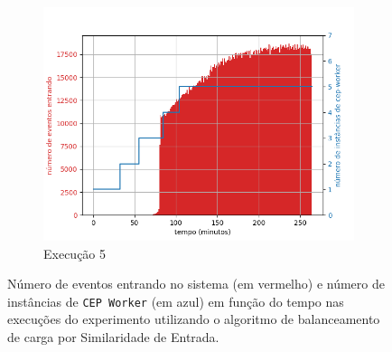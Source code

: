 \begin{figure}[p]
\begin{subfigure}{.5\textwidth}
  \includegraphics[width=\linewidth]{figuras/graphics/carga_e_workers_total10-dez-is.png}  
  \caption{Execução 5}
  \label{fig:cewt-10-dez-is}
\end{subfigure}
\caption{Número de eventos entrando no sistema (em vermelho) e número de instâncias de \texttt{CEP Worker} (em azul) em função do tempo nas execuções do experimento utilizando o algoritmo de balanceamento de carga por Similaridade de Entrada.}
\label{fig:workers_and_events_IS}
\end{figure}
 



